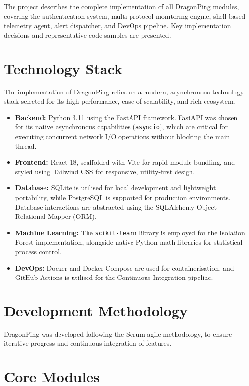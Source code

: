 \documentclass[12pt,a4paper,oneside]{report}
\begin{document}
The project describes the complete implementation of all DragonPing modules, covering the authentication system, multi-protocol monitoring engine, shell-based telemetry agent, alert dispatcher, and DevOps pipeline. Key implementation decisions and representative code samples are presented.

\section{Technology Stack}
\noindent The implementation of DragonPing relies on a modern, asynchronous technology stack selected for its high performance, ease of scalability, and rich ecosystem.
\begin{itemize}[label=\textbullet, leftmargin=*]
    \item \textbf{Backend:} Python 3.11 using the FastAPI framework. FastAPI was chosen for its native asynchronous capabilities (\texttt{asyncio}), which are critical for executing concurrent network I/O operations without blocking the main thread.
    \item \textbf{Frontend:} React 18, scaffolded with Vite for rapid module bundling, and styled using Tailwind CSS for responsive, utility-first design.
    \item \textbf{Database:} SQLite is utilised for local development and lightweight portability, while PostgreSQL is supported for production environments. Database interactions are abstracted using the SQLAlchemy Object Relational Mapper (ORM).
    \item \textbf{Machine Learning:} The \texttt{scikit-learn} library is employed for the Isolation Forest implementation, alongside native Python math libraries for statistical process control.
    \item \textbf{DevOps:} Docker and Docker Compose are used for containerisation, and GitHub Actions is utilised for the Continuous Integration pipeline.
\end{itemize}

\section{Development Methodology}
\noindent DragonPing was developed following the Scrum agile methodology, to ensure iterative progress and continuous integration of features.



\section{Core Modules}
\end{document}
